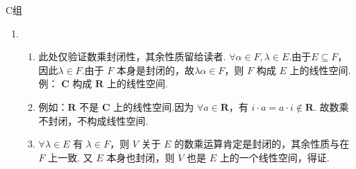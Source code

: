 \centerline{\heiti C组}
\begin{enumerate}
    \item \begin{enumerate}
        \item 此处仅验证数乘封闭性，其余性质留给读者. $\forall \alpha\in F,\lambda\in E$.由于$E\subseteq F$，因此$\lambda\in F$.由于 $F$ 本身是封闭的，故$\lambda\alpha\in F$，则 $F$ 构成 $E$ 上的线性空间.例： $\mathbf{C}$ 构成 $\mathbf{R}$ 上的线性空间.

        \item 例如：$\mathbf{R}$ 不是 $\mathbf{C}$ 上的线性空间.因为 $\forall a\in\mathbf{R}$，有 $i\cdot a=a\cdot i\not\in\mathbf{R}$. 故数乘不封闭，不构成线性空间.

        \item $\forall\lambda\in E$ 有 $\lambda\in F$，则 $V$ 关于 $E$ 的数乘运算肯定是封闭的，其余性质与在 $F$ 上一致. 又 $E$ 本身也封闭，则 $V$ 也是 $E$ 上的一个线性空间，得证.
    \end{enumerate}
\end{enumerate}

\clearpage
